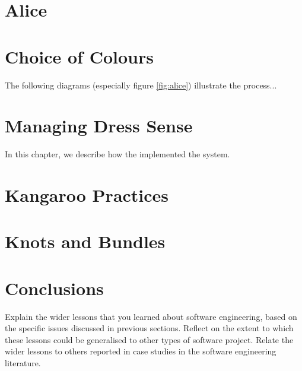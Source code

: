 \documentclass{l3proj}
\begin{document}
\section{Alice}
\label{sec:alice}




\section{Choice of Colours}
\label{design}

The following diagrams (especially figure \ref{fig:alice}) illustrate the
process...

\section{Managing Dress Sense}
\label{managing}

In this chapter, we describe how the implemented the system.

\section{Kangaroo Practices}



\section{Knots and Bundles}
\label{sec:managing}


\section{Conclusions}

Explain the wider lessons that you learned about software engineering,
based on the specific issues discussed in previous sections.  Reflect
on the extent to which these lessons could be generalised to other
types of software project.  Relate the wider lessons to others
reported in case studies in the software engineering literature.
\end{document}
